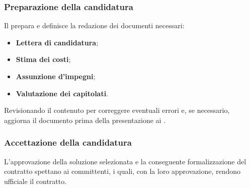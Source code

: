\subsubsection{Preparazione della candidatura}
Il  prepara e definisce la redazione dei documenti necessari:
\begin{itemize}
    \item \textbf{Lettera di candidatura};
    \item \textbf{Stima dei costi};
    \item \textbf{Assunzione d’impegni};
    \item \textbf{Valutazione dei capitolati}.
\end{itemize}
Revisionando il contenuto per correggere eventuali errori e, se necessario, aggiorna il documento prima della presentazione ai .

\subsubsection{Accettazione della candidatura}
L'approvazione della soluzione selezionata e la conseguente formalizzazione del contratto spettano ai committenti, i quali, con la loro approvazione, rendono ufficiale il contratto.